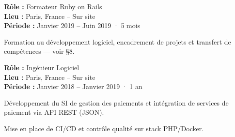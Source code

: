 \begin{cvgroup}

\begin{cvmetadata}
\textbf{Rôle :} Formateur Ruby on Rails \\
\textbf{Lieu :} Paris, France – Sur site \\
\textbf{Période :} Janvier 2019 – Juin 2019 · 5 mois
\end{cvmetadata}

\begin{cvdetailmissions}
  \item {Formation au développement logiciel, encadrement de projets et transfert de compétences — voir §8.}
\end{cvdetailmissions}

\end{cvgroup}

\begin{cvgroup}

\begin{cvmetadata}
\textbf{Rôle :} Ingénieur Logiciel \\
\textbf{Lieu :} Paris, France – Sur site \\
\textbf{Période :} Janvier 2018 – Janvier 2019 · 1 an
\end{cvmetadata}


\begin{cvdetailmissions}
  \item {Développement du SI de gestion des paiements et intégration de services de paiement via API REST (JSON).}
  \item {Mise en place de CI/CD et contrôle qualité sur stack PHP/Docker.}
\end{cvdetailmissions}

\end{cvgroup}

